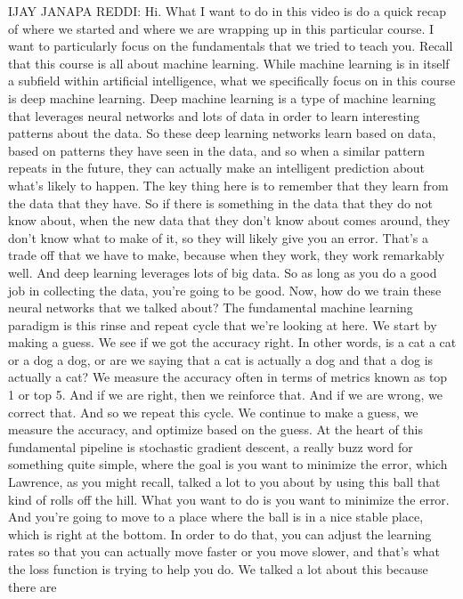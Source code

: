 IJAY JANAPA REDDI: Hi.
What I want to do in this video is do a quick recap of where we started
and where we are wrapping up in this particular course.
I want to particularly focus on the fundamentals
that we tried to teach you.
Recall that this course is all about machine learning.
While machine learning is in itself a subfield within
artificial intelligence, what we specifically focus on in this course
is deep machine learning.
Deep machine learning is a type of machine learning
that leverages neural networks and lots of data
in order to learn interesting patterns about the data.
So these deep learning networks learn based
on data, based on patterns they have seen in the data,
and so when a similar pattern repeats in the future,
they can actually make an intelligent prediction about what's
likely to happen.
The key thing here is to remember that they learn from the data
that they have.
So if there is something in the data that they do not know about,
when the new data that they don't know about comes around,
they don't know what to make of it, so they will likely give you an error.
That's a trade off that we have to make, because when they work,
they work remarkably well.
And deep learning leverages lots of big data.
So as long as you do a good job in collecting the data,
you're going to be good.
Now, how do we train these neural networks that we talked about?
The fundamental machine learning paradigm
is this rinse and repeat cycle that we're looking at here.
We start by making a guess.
We see if we got the accuracy right.
In other words, is a cat a cat or a dog a dog,
or are we saying that a cat is actually a dog and that a dog is actually a cat?
We measure the accuracy often in terms of metrics known as top 1 or top 5.
And if we are right, then we reinforce that.
And if we are wrong, we correct that.
And so we repeat this cycle.
We continue to make a guess, we measure the accuracy,
and optimize based on the guess.
At the heart of this fundamental pipeline
is stochastic gradient descent, a really buzz word for something quite simple,
where the goal is you want to minimize the error, which Lawrence, as you might
recall, talked a lot to you about by using this ball that kind of rolls off
the hill.
What you want to do is you want to minimize the error.
And you're going to move to a place where
the ball is in a nice stable place, which is right at the bottom.
In order to do that, you can adjust the learning rates
so that you can actually move faster or you move slower,
and that's what the loss function is trying to help you do.
We talked a lot about this because there are
